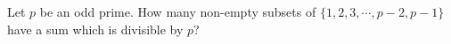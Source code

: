 Let $p$ be an odd prime. How many non-empty subsets of $\{1, 2, 3, \cdots, p-2, p-1\}$ have a sum which is divisible by $p$?
